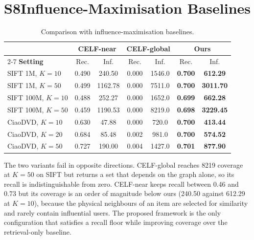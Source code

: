 \documentclass[conference]{IEEEtran}
\begin{document}
\section*{S8\quad Influence-Maximisation Baselines}
\label{sec:s8}

\begin{table}[h]
\caption{Comparison with influence-maximisation baselines.}
\label{tab:s8}
\begin{center}
\small
\setlength{\tabcolsep}{3pt}
\begin{tabular}{|l|c|c|c|c|c|c|}
\hline
& \multicolumn{2}{c|}{CELF-near} & \multicolumn{2}{c|}{CELF-global} & \multicolumn{2}{c|}{Ours} \\
\cline{2-7}
\textbf{Setting} & Rec. & Inf. & Rec. & Inf. & Rec. & Inf. \\
\hline
SIFT 1M, $K{=}10$   & 0.490 & 240.50  & 0.000 & 1546.0 & \textbf{0.700} & \textbf{612.29} \\
SIFT 1M, $K{=}50$   & 0.499 & 1162.78 & 0.000 & 7511.0 & \textbf{0.700} & \textbf{3011.70} \\
SIFT 100M, $K{=}10$ & 0.488 & 252.27 & 0.000 & 1652.0 & \textbf{0.699} & \textbf{662.28} \\
SIFT 100M, $K{=}50$ & 0.459 & 1190.53 & 0.000 & 8219.0 & \textbf{0.698} & \textbf{3229.45} \\
CiaoDVD, $K{=}10$   & 0.630 & 47.88   & 0.000 & 720.0  & \textbf{0.700} & \textbf{413.44} \\
CiaoDVD, $K{=}20$   & 0.684 & 85.48   & 0.002 & 981.0  & \textbf{0.700} & \textbf{574.52} \\
CiaoDVD, $K{=}50$   & 0.727 & 190.00  & 0.004 & 1427.0 & \textbf{0.701} & \textbf{877.90} \\
\hline
\end{tabular}
\end{center}
\end{table}

The two variants fail in opposite directions. CELF-global reaches 8219 coverage
at $K{=}50$ on SIFT but returns a set that depends on the graph alone, so its
recall is indistinguishable from zero. CELF-near keeps recall between 0.46 and
0.73 but its coverage is an order of magnitude below ours (240.50 against
612.29 at $K{=}10$), because the physical neighbours of an item are selected for
similarity and rarely contain influential users. The proposed framework is the
only configuration that satisfies a recall floor while improving coverage over
the retrieval-only baseline.


\end{document}
